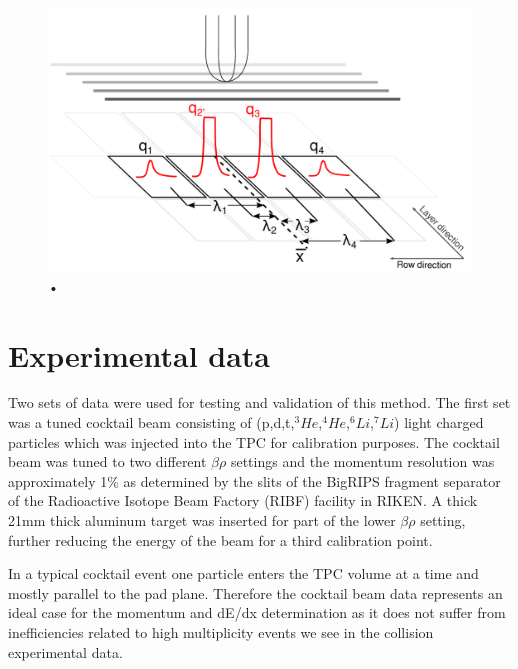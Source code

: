 \documentclass[review]{elsarticle}
\begin{document}
\begin{figure}[H]
\includegraphics[width=\linewidth]{saturated_pads}
\caption{•}
\label{fig:satpad}
\end{figure}

\section{Experimental data}

Two sets of data were used for testing and validation of this method. The first set was a tuned cocktail beam consisting of (p,d,t,${}^3He$,${}^4He$,${}^6Li$,${}^7Li$) light charged particles which was injected into the TPC for calibration purposes. The cocktail beam was tuned to two different $\beta\rho$ settings and the momentum resolution was approximately 1\% as determined by the slits of the BigRIPS fragment separator of the Radioactive Isotope Beam Factory (RIBF) facility in RIKEN. A thick 21mm thick aluminum target was inserted for part of the lower $\beta\rho$ setting, further reducing the energy of the beam for a third calibration point. 

In a typical cocktail event one particle enters the TPC volume at a time and mostly parallel to the pad plane. Therefore the cocktail beam data represents an ideal case for the momentum and dE/dx determination as it does not suffer from inefficiencies related to high multiplicity events we see in the collision experimental data.  
\end{document}
